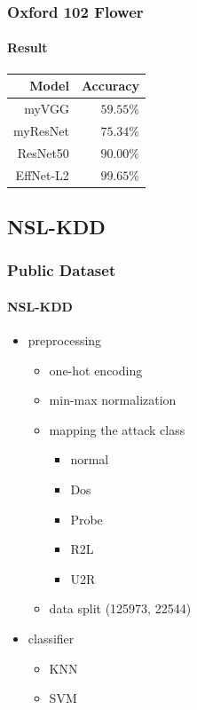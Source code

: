 \documentclass[
	11pt, %
	aspectratio=169, %
]{beamer}
\begin{document}
\begin{frame}
	\frametitle{Oxford 102 Flower}
	\framesubtitle{Result}

	\begin{center}
		\begin{tabular}{|rr|} 
			\hline
			Model&Accuracy\\          
			\hline                
			myVGG & $59.55\%$\\
			myResNet & $75.34\%$\\
			ResNet50 \cite{chen2021vision} & $90.00\%$\\
			EffNet-L2 \cite{foret2020sharpness}& $99.65\%$\\
			\hline
		\end{tabular}
	\end{center}
\end{frame}

\subsection{NSL-KDD}

\begin{frame}
	\frametitle{Public Dataset}
	\framesubtitle{NSL-KDD}

	\begin{itemize}
		\item preprocessing
		\begin{itemize}
			\item one-hot encoding
			\item min-max normalization
			\item mapping the attack class
				\begin{itemize}
					\item normal
					\item Dos
					\item Probe
					\item R2L
					\item U2R
				\end{itemize}
			\item data split (125973, 22544)
		\end{itemize}
		\item classifier
		\begin{itemize}
			\item KNN
			\item SVM
		\end{itemize}
	\end{itemize}
\end{frame}
\end{document}
